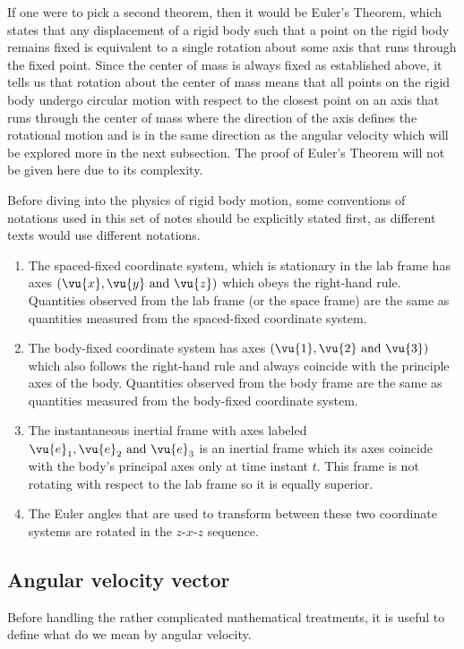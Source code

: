 \documentclass[a4paper,12pt]{report}
\begin{document}
If one were to pick a second theorem, then it would be Euler's Theorem, which states that any displacement of a rigid body such that a point on the rigid body remains fixed is equivalent to a single rotation about some axis that runs through the fixed point. Since the center of mass is always fixed as established above, it tells us that rotation about the center of mass means that all points on the rigid body undergo circular motion with respect to the closest point on an axis that runs through the center of mass where the direction of the axis defines the rotational motion and is in the same direction as the angular velocity which will be explored more in the next subsection. The proof of Euler's Theorem will not be given here due to its complexity.

Before diving into the physics of rigid body motion, some conventions of notations used in this set of notes should be explicitly stated first, as different texts would use different notations. 

\begin{enumerate}
	\item The spaced-fixed coordinate system, which is stationary in the lab frame has axes \((\vu{x}, \vu{y} \text{ and } \vu{z} )\) which obeys the right-hand rule. Quantities observed from the lab frame (or the space frame) are the same as quantities measured from the spaced-fixed coordinate system.

	\item The body-fixed coordinate system has axes \((\vu{1 }, \vu{2 } \text{ and } \vu{3 })\) which also follows the right-hand rule and always coincide with the principle axes of the body. Quantities observed from the body frame are the same as quantities measured from the body-fixed coordinate system.

	\item The instantaneous inertial frame with axes labeled \(\vu{e} _{1},\vu{e} _{2} \text{ and } \vu{e} _{3} \) is an inertial frame which its axes coincide with the body's principal axes only at time instant \(t\). This frame is not rotating with respect to the lab frame so it is equally superior. 
	
	\item The Euler angles that are used to transform between these two coordinate systems are rotated in the \(z\)-\(x\)-\(z\) sequence. 
\end{enumerate}

\subsection{Angular velocity vector}
Before handling the rather complicated mathematical treatments, it is useful to define what do we mean by angular velocity. 
\end{document}
